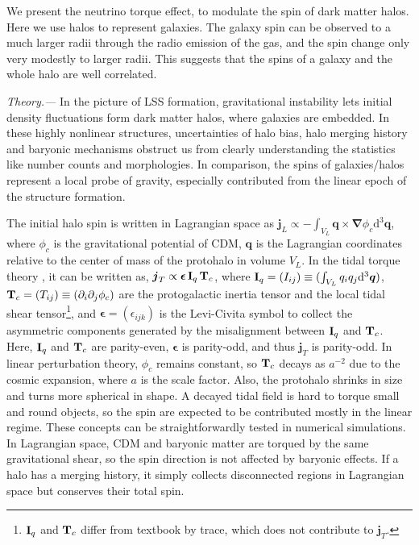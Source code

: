 \documentclass[aps,prd,twocolumn,amsmath,amssymb,amsfont,superscriptaddress,nofootinbib]{revtex4-1}
\newcommand{\bs}{\boldsymbol}
\newcommand{\diff}{{\mathrm d}}
\newcommand{\T}{\bold{T}}
\newcommand{\I}{\bold{I}}
\newcommand{\spin}{\bs{j}}
\begin{document}
We present the neutrino torque effect, to modulate the spin of dark matter halos.
Here we use halos to represent galaxies.
The galaxy spin can be observed to a much larger radii through the radio emission of the gas, and the spin change only very modestly to larger radii. This suggests that the spins of a galaxy and the whole halo are well correlated.

\textit{Theory.---}
In the picture of LSS formation, gravitational instability lets initial density fluctuations form dark matter halos, where galaxies are embedded.
In these highly nonlinear structures, uncertainties of halo bias, 
halo merging history and baryonic mechanisms obstruct us from clearly 
understanding the statistics like number counts and morphologies.
In comparison, the spins of galaxies/halos represent a local probe of gravity, 
especially contributed from the linear epoch of the structure formation. 

The initial halo spin is written in Lagrangian space as 
$\spin_L\propto-\int_{V_L}\bs{q}\times\bs{\nabla}\phi_c\diff^3\bs{q}$, 
where $\phi_c$ is the gravitational potential of CDM, 
$\bs{q}$ is the Lagrangian coordinates relative to the center of mass of the protohalo in volume $V_L$. 
In the tidal torque theory \citep{1984ApJ...286...38W},
it can be written as,
$\spin_T\propto\bs{\epsilon}\,\I_q\,\T_c$, where
$\I_q=(I_{ij})\equiv(\int_{V_L} q_i q_j \diff^3\bs{q})$,
$\T_c=(T_{ij})\equiv(\partial_i\partial_j\phi_c)$
are the protogalactic inertia tensor and the local tidal shear tensor\footnote{$\I_q$ 
and $\T_c$ differ from textbook by trace, which does not contribute to $\spin_T$.}, 
and $\bs{\epsilon}=(\epsilon_{ijk})$ is the Levi-Civita symbol to collect the asymmetric components generated by
the misalignment between $\I_q$ and $\T_c$. Here, $\I_q$ and $\T_c$ are parity-even, $\bs{\epsilon}$ is parity-odd, and thus $\spin_T$ is parity-odd.
In linear perturbation theory, $\phi_c$ remains constant, so $\T_c$ decays as $a^{-2}$ due to the cosmic expansion, where $a$ is the scale factor.
Also, the protohalo shrinks in size and turns more spherical in shape.
A decayed tidal field is hard to torque small and round objects, so the spin are expected to be contributed mostly in the linear regime.
These concepts can be straightforwardly tested in numerical simulations. 
In Lagrangian space, CDM and baryonic matter are torqued by the same gravitational shear, so the spin direction is not affected by baryonic effects. 
If a halo has a merging history, it simply collects disconnected regions in Lagrangian space but conserves their total spin. 
\end{document}

